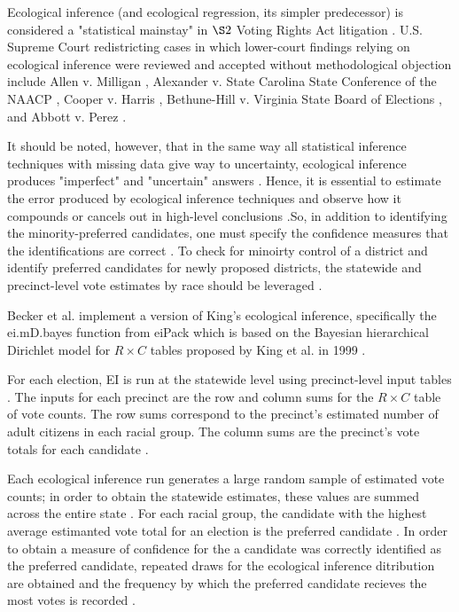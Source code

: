 \documentclass[sn-vancouver,Numbered]{sn-jnl}
\theoremstyle{thmstyleone}%
\theoremstyle{thmstyletwo}%
\theoremstyle{thmstylethree}%
\begin{document}
Ecological inference (and ecological regression, its simpler predecessor) is considered a "statistical mainstay" in $\S2$ Voting Rights Act litigation \cite{freedman1999ecological}. U.S. Supreme Court redistricting cases in which lower-court findings relying on ecological inference were reviewed and accepted without methodological objection include Allen v. Milligan \cite{allen_milligan_2023}, Alexander v. State Carolina State Conference of the NAACP \cite{alexander2024}, Cooper v. Harris \cite{cooper2017}, Bethune-Hill v. Virginia State Board of Elections \cite{bethunehill2017}, and Abbott v. Perez \cite{abbott2018}.

It should be noted, however, that in the same way all statistical inference techniques with missing data give way to uncertainty, ecological inference produces "imperfect" and "uncertain" answers \cite{BeckerDuchinGoldHirsch2021}. Hence, it is essential to estimate the error produced by ecological inference techniques and observe how it compounds or cancels out in high-level conclusions \cite{BeckerDuchinGoldHirsch2021}.So, in addition to identifying the minority-preferred candidates, one must specify the confidence measures that the identifications are correct \cite{BeckerDuchinGoldHirsch2021}. To check for minoirty control of a district and identify preferred candidates for newly proposed districts, the statewide and precinct-level vote estimates by race should be leveraged \cite{BeckerDuchinGoldHirsch2021}.

Becker et al. \cite{BeckerDuchinGoldHirsch2021} implement a version of King's ecological inference, specifically the ei.mD.bayes function from eiPack which is based on the Bayesian hierarchical Dirichlet model for $R \times C$ tables proposed by King et al. in 1999 \cite{king1999binomial_beta_ei}. 

For each election, EI is run at the statewide level using precinct-level input tables \cite{BeckerDuchinGoldHirsch2021}. The inputs for each precinct are the row and column sums for the $R \times C$ table of vote counts. The row sums correspond to the precinct's estimated number of adult citizens in each racial group. The column sums are the precinct's vote totals for each candidate \cite{BeckerDuchinGoldHirsch2021}.

Each ecological inference run generates a large random sample of estimated vote counts; in order to obtain the statewide estimates, these values are summed across the entire state \cite{BeckerDuchinGoldHirsch2021}. For each racial group, the candidate with the highest average estimanted vote total for an election is the preferred candidate \cite{BeckerDuchinGoldHirsch2021}. In order to obtain a measure of confidence for the a candidate was correctly identified as the preferred candidate, repeated draws for the ecological inference ditribution are obtained and the frequency by which the preferred candidate recieves the most votes is recorded \cite{BeckerDuchinGoldHirsch2021}.
\end{document}
